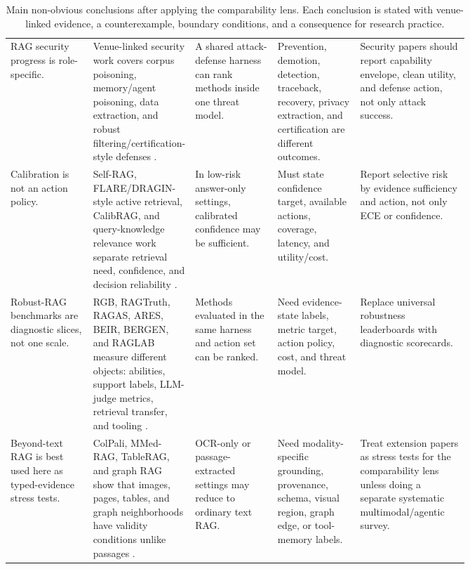 \begin{table}[t]
\begin{tabularx}{\linewidth}{>{\raggedright\arraybackslash}p{0.18\linewidth}>{\raggedright\arraybackslash}p{0.22\linewidth}>{\raggedright\arraybackslash}p{0.18\linewidth}>{\raggedright\arraybackslash}p{0.18\linewidth}X}
RAG security progress is role-specific. & Venue-linked security work covers corpus poisoning, memory/agent poisoning, data extraction, and robust filtering/certification-style defenses \citep{poisonedRAG2024,rrag053,venue200SpillBeans,rrag021,rrag017}. & A shared attack-defense harness can rank methods inside one threat model. & Prevention, demotion, detection, traceback, recovery, privacy extraction, and certification are different outcomes. & Security papers should report capability envelope, clean utility, and defense action, not only attack success. \\
Calibration is not an action policy. & Self-RAG, FLARE/DRAGIN-style active retrieval, CalibRAG, and query-knowledge relevance work separate retrieval need, confidence, and decision reliability \citep{selfRAG2023,flare2023active,venue200DRAGIN,calibRAG2025,venue200QueryKnowledge}. & In low-risk answer-only settings, calibrated confidence may be sufficient. & Must state confidence target, available actions, coverage, latency, and utility/cost. & Report selective risk by evidence sufficiency and action, not only ECE or confidence. \\
Robust-RAG benchmarks are diagnostic slices, not one scale. & RGB, RAGTruth, RAGAS, ARES, BEIR, BERGEN, and RAGLAB measure different objects: abilities, support labels, LLM-judge metrics, retrieval transfer, and tooling \citep{rgb2023,ragTruth2024,ragas2024,ares2024,beir2021,venue200BERGEN,venue200RAGLAB}. & Methods evaluated in the same harness and action set can be ranked. & Need evidence-state labels, metric target, action policy, cost, and threat model. & Replace universal robustness leaderboards with diagnostic scorecards. \\
Beyond-text RAG is best used here as typed-evidence stress tests. & ColPali, MMed-RAG, TableRAG, and graph RAG show that images, pages, tables, and graph neighborhoods have validity conditions unlike passages \citep{colpali2025,mmedrag2025,tableRAG2024,venueAcc004}. & OCR-only or passage-extracted settings may reduce to ordinary text RAG. & Need modality-specific grounding, provenance, schema, visual region, graph edge, or tool-memory labels. & Treat extension papers as stress tests for the comparability lens unless doing a separate systematic multimodal/agentic survey. \\
\bottomrule
\end{tabularx}
\caption{Main non-obvious conclusions after applying the comparability lens. Each conclusion is stated with venue-linked evidence, a counterexample, boundary conditions, and a consequence for research practice.}
\label{tab:main-strong-conclusions}
\end{table}
